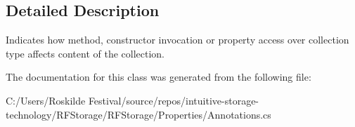 \subsection{Detailed Description}
Indicates how method, constructor invocation or property access over collection type affects content of the collection. 



The documentation for this class was generated from the following file\+:\begin{DoxyCompactItemize}
\item 
C\+:/\+Users/\+Roskilde Festival/source/repos/intuitive-\/storage-\/technology/\+R\+F\+Storage/\+R\+F\+Storage/\+Properties/Annotations.\+cs\end{DoxyCompactItemize}

